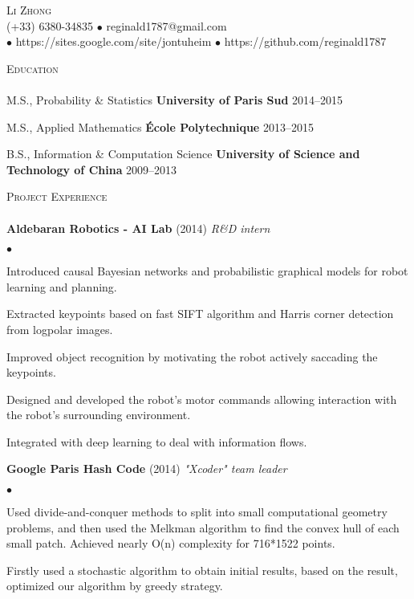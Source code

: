 \documentclass{article}
\newcommand{\lineunder}{\vspace*{-8pt} \\ \hspace*{-18pt} \hrulefill \\}
\newcommand{\header}[1]{{\hspace*{-15pt}\vspace*{6pt} \textsc{#1}} \vspace*{-6pt} \lineunder}
\newcommand{\employer}[3]{{ \textbf{#1} (#2) \hfill {\emph{#3}} \\  }}
\newcommand{\contact}[3]{
\vspace*{-8pt}
\begin{center}
{\LARGE \scshape {#1}}\\
#2 \\%
#3
\end{center}
\vspace*{-8pt}
}
\newenvironment{achievements}{\begin{list}{$\bullet$}{\topsep 0pt \itemsep -2pt}}{\vspace*{4pt}\end{list}}
\newcommand{\schools}[3]{
#1 \hfill \hspace*{15pt} \textbf{#2} \hspace*{15pt} #3\\ 
\vspace*{5pt}
}
\begin{document}
\small
\smallskip
\vspace*{-44pt}

\contact{Li Zhong}
{(+33) 6380-34835 $\bullet$ reginald1787@gmail.com}
{$\bullet$ https://sites.google.com/site/jontuheim $\bullet$ https://github.com/reginald1787}

\header{Education}

\schools{M.S., Probability \& Statistics}{University of Paris Sud}{2014--2015}
\schools{M.S., Applied Mathematics}{\'Ecole Polytechnique}{2013--2015}
\schools{B.S., Information \& Computation Science}{University of Science and Technology of China}{2009--2013}
	

\header{Project Experience}


\employer{Aldebaran Robotics - AI Lab }{2014}{R\&D intern}{}
	\begin{achievements}
	\item Introduced causal Bayesian networks and probabilistic graphical models for robot learning and planning.
	\item Extracted keypoints based on fast SIFT algorithm and Harris corner detection from logpolar images.
	\item Improved object recognition by motivating the robot actively saccading the keypoints. 
	\item Designed and developed the robot's motor commands allowing interaction with the robot's surrounding environment.
	\item Integrated with deep learning to deal with information flows.
	\end{achievements}

\employer{Google Paris Hash Code}{2014}{"Xcoder" team leader}
	\begin{achievements}
	\item Used divide-and-conquer methods to split into small computational geometry problems, and then used the Melkman algorithm to find the convex hull of each small patch. Achieved nearly O(n) complexity for 716*1522 points.
	\item Firstly used a stochastic algorithm to obtain initial results, based on the result, optimized our algorithm by greedy strategy.
	\end{achievements}
\end{document}
